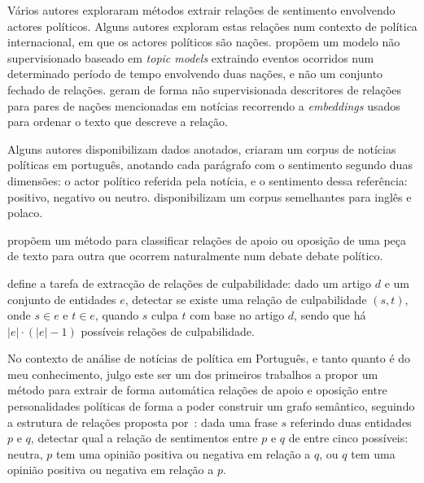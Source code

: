 \documentclass[a4paper, twocolumn, 11pt, twoside]{article}
\begin{document}
Vários autores exploraram métodos extrair relações de sentimento envolvendo actores políticos. Alguns autores exploram estas relações num contexto de política internacional, em que os actores políticos são  nações. \cite{oconnor-etal-2013-learning} propõem um modelo não supervisionado baseado em \textit{topic models} extraindo eventos ocorridos num determinado período de tempo envolvendo duas nações, e não um conjunto fechado de relações. \cite{han-etal-2019-permanent} geram de forma não supervisionada descritores de relações para pares de nações mencionadas em notícias recorrendo a \textit{embeddings} usados para ordenar o texto que descreve a relação.

Alguns autores disponibilizam dados anotados, \cite{de-arruda-etal-2015-annotated} criaram um corpus de notícias políticas em português, anotando cada parágrafo com o sentimento segundo duas dimensões: o actor político referida pela notícia, e o sentimento dessa referência: positivo, negativo ou neutro. \cite{BARANIAK20213627} disponibilizam um corpus semelhantes para inglês e polaco.

\cite{cocarascu-toni-2017-identifying} propõem um método para classificar relações de apoio ou oposição de uma peça de texto para outra que ocorrem naturalmente num debate debate político.

\cite{liang2019blames} define a tarefa de extracção de relações de culpabilidade: dado um artigo $d$ e um conjunto de entidades $e$, detectar se existe uma relação de culpabilidade $(s,t)$, onde $s \in e$ e $t \in e$, quando $s$ culpa $t$ com base no artigo $d$, sendo que há $|e| \cdot (|e| - 1)$ possíveis relações de culpabilidade.

No contexto de análise de notícias de política em Português, e tanto quanto é do meu conhecimento, julgo este ser um dos primeiros trabalhos a propor um método para extrair de forma automática relações de apoio e oposição entre personalidades políticas de forma a poder construir um grafo semântico, seguindo a estrutura de relações proposta por~\cite{park-etal-2021-blames}: dada uma frase $s$ referindo duas entidades $p$ e $q$, detectar qual a relação de sentimentos entre $p$ e $q$ de entre cinco possíveis: neutra, $p$ tem uma opinião positiva ou negativa em relação a $q$, ou $q$ tem uma opinião positiva ou negativa em relação a $p$.
\end{document}
